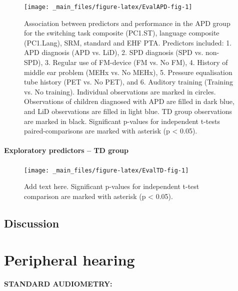 \documentclass[a4paper, twoside]{templates/ociamthesis}
\begin{document}
\begin{figure}

{\centering \texttt{[image: \_main\_files/figure-latex/EvalAPD-fig-1]} 

}

\caption{Association between predictors and performance in the APD group for the switching task composite (PC1.ST), language composite (PC1.Lang), SRM, standard and EHF PTA. Predictors included: 1. APD diagnosis (APD vs. LiD), 2. SPD diagnosis (SPD vs. non-SPD), 3. Regular use of FM-device (FM vs. No FM), 4. History of middle ear problem (MEHx vs. No MEHx), 5. Pressure equalisation tube history (PET vs. No PET), and 6. Auditory training (Training vs. No training). Individual observations are marked in circles. Observations of children diagnosed with APD are filled in dark blue, and LiD observations are filled in light blue. TD group observations are marked in black. Significant p-values for independent t-tests paired-comparisons are marked with asterisk (p < 0.05).}\label{fig:EvalAPD-fig}
\end{figure}

\hypertarget{exploratory-predictors-td-group}{%
\subsubsection{Exploratory predictors -- TD group}\label{exploratory-predictors-td-group}}

\begin{figure}

{\centering \texttt{[image: \_main\_files/figure-latex/EvalTD-fig-1]} 

}

\caption{Add text here. Significant p-values for independent t-test comparison are marked with asterisk (p < 0.05).}\label{fig:EvalTD-fig}
\end{figure}

\hypertarget{discussion-4}{%
\section{Discussion}\label{discussion-4}}

\hypertarget{peripheral-hearing}{%
\chapter{Peripheral hearing}\label{peripheral-hearing}}

\textbf{STANDARD AUDIOMETRY:}
\end{document}
